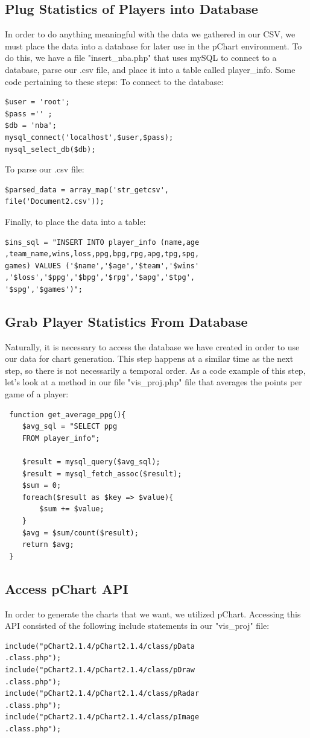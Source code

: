 \documentclass[journal]{vgtc}                %
\begin{document}
\subsection{Plug Statistics of Players into Database}
In order to do anything meaningful with the data we gathered in our CSV, we must place the data into a database for later use in the pChart environment. To do this, we have a file "insert\_nba.php" that uses mySQL to connect to a database, parse our .csv file, and place it into a table called player\_info. Some code pertaining to these steps:
To connect to the database:
\begin{lstlisting}
$user = 'root';
$pass ='' ; 
$db = 'nba';
mysql_connect('localhost',$user,$pass);
mysql_select_db($db);
\end{lstlisting}
To parse our .csv file:
\begin{lstlisting}
$parsed_data = array_map('str_getcsv',
file('Document2.csv'));
\end{lstlisting}
Finally, to place the data into a table:
\begin{lstlisting}
$ins_sql = "INSERT INTO player_info (name,age
,team_name,wins,loss,ppg,bpg,rpg,apg,tpg,spg,
games) VALUES ('$name','$age','$team','$wins'
,'$loss','$ppg','$bpg','$rpg','$apg','$tpg',
'$spg','$games')";
\end{lstlisting}

\subsection{Grab Player Statistics From Database}
Naturally, it is necessary to access the database we have created in order to use our data for chart generation. This step happens at a similar time as the next step, so there is not necessarily a temporal order. As a code example of this step, let's look at a method in our file "vis\_proj.php" file that averages the points per game of a player:
\begin{lstlisting}
 function get_average_ppg(){
 	$avg_sql = "SELECT ppg 
	FROM player_info";
 	
	$result = mysql_query($avg_sql);
 	$result = mysql_fetch_assoc($result);
 	$sum = 0;
 	foreach($result as $key => $value){
 		$sum += $value;
 	}
 	$avg = $sum/count($result);
  	return $avg;
 }
\end{lstlisting}

\subsection{Access pChart API}
In order to generate the charts that we want, we utilized pChart. Accessing this API consisted of the following include statements in our "vis\_proj" file:
\begin{lstlisting}
include("pChart2.1.4/pChart2.1.4/class/pData
.class.php");
include("pChart2.1.4/pChart2.1.4/class/pDraw
.class.php");
include("pChart2.1.4/pChart2.1.4/class/pRadar
.class.php");
include("pChart2.1.4/pChart2.1.4/class/pImage
.class.php");
\end{lstlisting}
\end{document}
